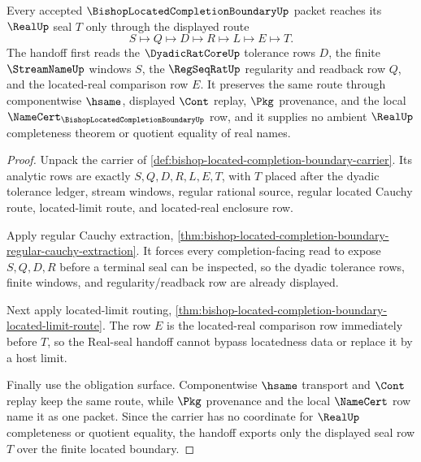 \begin{theorem}
\label{thm:bishoplocatedcompletionboundary-located-real-seal-handoff}
Every accepted $\BishopLocatedCompletionBoundaryUp$ packet reaches its $\RealUp$ seal $T$ only through the displayed route
$$
S\longmapsto Q\longmapsto D\longmapsto R\longmapsto L\longmapsto E\longmapsto T .
$$
The handoff first reads the $\DyadicRatCoreUp$ tolerance rows $D$, the finite $\StreamNameUp$ windows $S$, the $\RegSeqRatUp$ regularity and readback row $Q$, and the located-real comparison row $E$. It preserves the same route through componentwise $\hsame$, displayed $\Cont$ replay, $\Pkg$ provenance, and the local $\NameCert_{\BishopLocatedCompletionBoundaryUp}$ row, and it supplies no ambient $\RealUp$ completeness theorem or quotient equality of real names.
\end{theorem}
\begin{proof}
Unpack the carrier of \autoref{def:bishop-located-completion-boundary-carrier}. Its analytic rows are exactly $S,Q,D,R,L,E,T$, with $T$ placed after the dyadic tolerance ledger, stream windows, regular rational source, regular located Cauchy route, located-limit route, and located-real enclosure row.

Apply regular Cauchy extraction, \autoref{thm:bishop-located-completion-boundary-regular-cauchy-extraction}. It forces every completion-facing read to expose $S,Q,D,R$ before a terminal seal can be inspected, so the dyadic tolerance rows, finite windows, and regularity/readback row are already displayed.

Next apply located-limit routing, \autoref{thm:bishop-located-completion-boundary-located-limit-route}. The row $E$ is the located-real comparison row immediately before $T$, so the Real-seal handoff cannot bypass locatedness data or replace it by a host limit.

Finally use the obligation surface. Componentwise $\hsame$ transport and $\Cont$ replay keep the same route, while $\Pkg$ provenance and the local $\NameCert$ row name it as one packet. Since the carrier has no coordinate for $\RealUp$ completeness or quotient equality, the handoff exports only the displayed seal row $T$ over the finite located boundary.
\end{proof}

